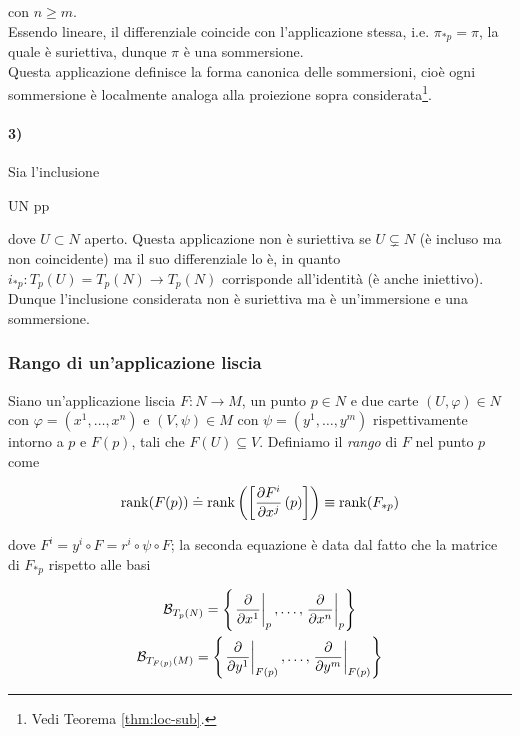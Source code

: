 con $ n \geqslant m $. \\
Essendo lineare, il differenziale coincide con l'applicazione stessa, i.e. $ \pi_{*p} = \pi $, la quale è suriettiva, dunque $ \pi $ è una sommersione. \\
Questa applicazione definisce la forma canonica delle sommersioni, cioè ogni sommersione è localmente analoga alla proiezione sopra considerata\footnote{%
	Vedi Teorema \ref{thm:loc-sub}.%
}.

\paragraph{3)}

Sia l'inclusione

	{U}{N}
	{p}{p}

dove $ U \subset N $ aperto. Questa applicazione non è suriettiva se $ U \subsetneq N $ (è incluso ma non coincidente) ma il suo differenziale lo è, in quanto $ i_{*p} : T_{p}(U) = T_{p}(N) \to T_{p}(N) $ corrisponde all'identità (è anche iniettivo). \\
Dunque l'inclusione considerata non è suriettiva ma è un'immersione e una sommersione.

\subsubsection{Rango di un'applicazione liscia}

Siano un'applicazione liscia $ F : N \to M $, un punto $ p \in N $ e due carte $ (U,\varphi) \in N $ con $ \varphi = (x^{1},\dots,x^{n}) $ e $ (V,\psi) \in M $ con $ \psi = (y^{1},\dots,y^{m}) $ rispettivamente intorno a $ p $ e $ F(p) $, tali che $ F(U) \subseteq V $. Definiamo il \textit{rango} di $ F $ nel punto $ p $ come

\begin{equation}
	\rank(F(p)) \doteq \rank\left( \left[ \pdv{F^{i}}{x^{j}} \, (p) \right] \right) %
	\equiv \rank(F_{*p})
\end{equation}

dove $ F^{i} = y^{i} \circ F = r^{i} \circ \psi \circ F $; la seconda equazione è data dal fatto che la matrice di $ F_{*p} $ rispetto alle basi

\begin{gather}
	\mathcal{B}_{T_{p}(N)} = \left\{ \eval{ \pdv{x^{1}} }_{p}, \dots, \eval{ \pdv{x^{n}} }_{p} \right\} \\
	\mathcal{B}_{T_{F(p)}(M)} = \left\{ \eval{ \pdv{y^{1}} }_{F(p)}, \dots, \eval{ \pdv{y^{m}} }_{F(p)} \right\}
\end{gather}

